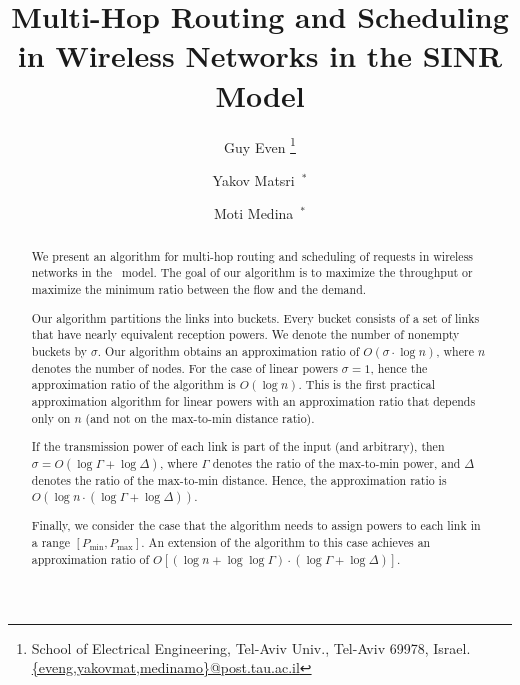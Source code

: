 \documentclass[11pt]{article}
\newenvironment{proof sketch}{\noindent {\bf Proof sketch:} }{\hfill \qed}
\newcommand{\sinr}{\text{\sc{sinr}}}
\newcommand{\pmin}{P_{\min}}
\newcommand{\pmax}{P_{\max}}
\newcommand{\sigdiv}{\sigma}
\begin{document}
\title{Multi-Hop Routing and Scheduling in Wireless Networks in the SINR Model}

\author{Guy Even
\thanks{School of Electrical Engineering,
Tel-Aviv Univ., Tel-Aviv 69978, Israel.
\protect\url{{eveng,yakovmat,medinamo}@post.tau.ac.il}}
\and
Yakov Matsri~$^*$
\and
Moti Medina~$^*$
\date{}
}
\maketitle \date{}




\begin{abstract}
  We present an algorithm for multi-hop routing and scheduling of
  requests in wireless networks in the \sinr\ model. The goal of our
  algorithm is to maximize the throughput or maximize the minimum
  ratio between the flow and the demand.

  Our algorithm partitions the links into buckets.  Every bucket
  consists of a set of links that have nearly equivalent reception
  powers.  We denote the number of nonempty buckets by $\sigdiv$.  Our
  algorithm obtains an approximation ratio of $O(\sigdiv \cdot \log
  n)$, where $n$ denotes the number of nodes.  For the case of linear
  powers $\sigdiv =1$, hence the approximation ratio of the algorithm
  is $O(\log n)$.  This is the first practical approximation algorithm
  for linear powers with an approximation ratio that depends only on
  $n$ (and not on the max-to-min distance ratio).

  If the transmission power of each link is part of the input (and
  arbitrary), then $\sigdiv = O(\log\Gamma + \log \Delta)$, where
  $\Gamma$ denotes the ratio of the max-to-min power, and $\Delta $
  denotes the ratio of the max-to-min distance.  Hence, the
  approximation ratio is $O(\log n \cdot (\log\Gamma + \log \Delta))$.

  Finally, we consider the case that the algorithm needs to assign
  powers to each link in a range $[\pmin,\pmax]$. An extension of the
  algorithm to this case achieves an approximation ratio of $O[(\log n
  + \log \log \Gamma) \cdot (\log\Gamma + \log \Delta)]$.

\end{abstract}
\begin{comment}

  \paragraph{ Keywords:}
\end{comment}
\end{document}
